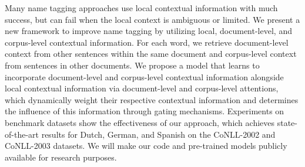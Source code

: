 Many name tagging approaches use local contextual information with much success, but can fail when the local context is ambiguous or limited. We present a new framework to improve name tagging by utilizing local, document-level, and corpus-level contextual information. For each word, we retrieve document-level context from other sentences within the same document and corpus-level context from sentences in other documents. We propose a model that learns to incorporate document-level and corpus-level contextual information alongside local contextual information via document-level and corpus-level attentions, which dynamically weight their respective contextual information and determines the influence of this information through gating mechanisms. Experiments on benchmark datasets show the effectiveness of our approach, which achieves state-of-the-art results for Dutch, German, and Spanish on the CoNLL-2002 and CoNLL-2003 datasets. We will make our code and pre-trained models publicly available for research purposes.
